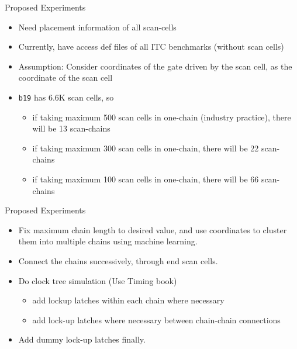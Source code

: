 \begin{frame}{Proposed Experiments}
\begin{itemize}
	\item Need placement information of all scan-cells
	\item Currently, have access def files of all ITC benchmarks (without scan cells)
	\item \alert{Assumption}: Consider coordinates of the gate driven by the scan cell, as the coordinate of the scan cell
	\item \texttt{b19} has 6.6K scan cells, so 
	\begin{itemize}
		\item if taking maximum 500 scan cells in one-chain (industry practice), there will be 13 scan-chains
		\item if taking maximum 300 scan cells in one-chain, there will be 22 scan-chains
		\item if taking maximum 100 scan cells in one-chain, there will be 66 scan-chains

	\end{itemize}
\end{itemize}
\end{frame}

\begin{frame}{Proposed Experiments}
\begin{itemize}
	\item Fix maximum chain length to desired value, and use coordinates to cluster them into multiple chains using machine learning. 
	\item Connect the chains successively, through end scan cells. 
	\item Do clock tree simulation (Use Timing book)
	\begin{itemize}
		\item add lockup latches within each chain where necessary
		\item add lock-up latches where necessary between chain-chain connections
	\end{itemize}
	\item Add dummy lock-up latches finally. 
\end{itemize}
\end{frame}

